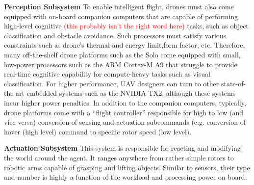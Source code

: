 \textbf{Perception Subsystem} To enable intelligent flight, drones must also come equipped with on-board companion computers that are capable of performing high-level cognitive \textcolor{red}{(this probably isn't the right word here)} tasks, such as object classification and obstacle avoidance. Such processors must satisfy various constraints such as drone's thermal and energy limit,form factor, etc. Therefore, many off-the-shelf drone platforms such as the Solo come equipped with small, low-power processors such as the ARM Cortex-M A9 that struggle to provide real-time cognitive capability for compute-heavy tasks such as visual classification. For higher performance, UAV designers can turn to other state-of-the-art embedded systems such as the NVIDIA TX2, although these systems incur higher power penalties. In addition to the companion computers, typically, drone platforms come with a ``flight controller'' responsible for high to low (and vice versa) conversion of sensing and actuation subcommands (e.g. conversion of hover (high level) command to specific rotor speed (low level).

\textbf{Actuation Subsystem} This system is responsible for reacting and modifying the world around the agent. It ranges anywhere from rather simple rotors to robotic arms capable of grasping and lifting objects.
Similar to sensors, their type and number is highly a function of the workload and processing power on board. 
